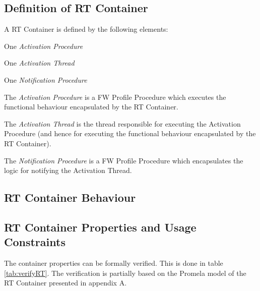 \documentclass[a4paper,10pt]{article}
\newenvironment{fw_itemize}						%
{\begin{itemize}
  \setlength{\itemsep}{1mm}
  \setlength{\parskip}{0pt}
  \setlength{\parsep}{0pt}}
{\end{itemize}}
\begin{document}
\subsection{Definition of RT Container}
A RT Container is defined by the following elements:

\begin{fw_itemize} 
\item One \emph{Activation Procedure}
\item One \emph{Activation Thread}
\item One \emph{Notification Procedure} 
\end{fw_itemize}

The \emph{Activation Procedure} is a FW Profile Procedure which executes the functional behaviour encapsulated by the RT Container.

The \emph{Activation Thread} is the thread responsible for executing the Activation Procedure (and hence for executing the functional behaviour encapsulated by the RT Container).

The \emph{Notification Procedure} is a FW Profile Procedure which encapsulates the logic for notifying the Activation Thread.

\subsection{RT Container Behaviour}\label{sec:rtContainersBehaviour}


\subsection{RT Container Properties and Usage Constraints}\label{sec:rtPropUsage}


The container properties can be formally verified. This is done in table \ref{tab:verifyRT}. The verification
is partially based on the Promela model of the RT Container presented in appendix A.
\end{document}
